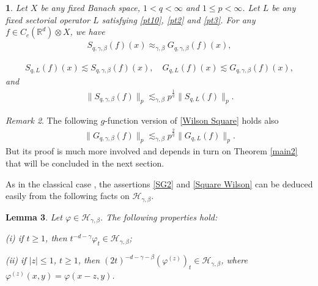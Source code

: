 \documentclass[oneside,english,a4wide]{amsart}
\numberwithin{equation}{section}
\numberwithin{figure}{section}
\theoremstyle{plain}
\newtheorem{thm}{\protect\theoremname}[section]
\theoremstyle{plain}
\theoremstyle{definition}
\theoremstyle{plain}
\newtheorem{lemma}[thm]{Lemma}
\theoremstyle{remark}
\theoremstyle{definition}
\theoremstyle{remark}
\newtheorem{remark}[thm]{Remark}
\theoremstyle{definition}
\providecommand{\theoremname}{Theorem}
\newcommand{\f}{\varphi}
\newcommand{\8}{+\infty}
\renewcommand{\1}{\mathbbm{1}}
\newcommand\sk[1]{ \left( #1 \right) }
\begin{document}
{%


\begin{thm}\label{equiv}
Let $X$ be any fixed Banach space, $1<q<\infty$ and $1\leq p<\infty$. Let $L$ be any fixed sectorial operator $L$ satisfying \eqref{pt10}, \eqref{pt2} and \eqref{pt3}. For any $f\in C_c(\mathbb R^d)\otimes X$, we have 
 \begin{align}\label{SG2}
  S_{q, \gamma,\beta}(f)(x) \approx_{\gamma, \beta} G_{q, \gamma,\beta}(f)(x),
 \end{align}
 

\begin{align}\label{Square Wilson}
    S_{q, L}(f)(x) \lesssim  S_{q, \gamma,\beta}(f)(x), \quad G_{q, L}(f)(x) \lesssim  G_{q, \gamma,\beta}(f)(x),
\end{align}
 and 
   \begin{align}\label{Wilson Square}
\| S_{q, \gamma,\beta}(f) \|_p \lesssim_{\gamma,\beta} p^{\frac{1}{q}}\| S_{q,L}(f) \|_{p}.
  \end{align}
\end{thm}

\begin{remark}
The following $g$-function version of \eqref{Wilson Square} holds also
   \begin{align}\label{Wilson G}
\| G_{q, \gamma,\beta}(f) \|_p \lesssim_{\gamma,\beta} {p^{\frac{2}{q}}  }\| G_{q,L}(f) \|_{p}.
  \end{align}
But its proof is much more involved and depends in turn on Theorem \ref{main2} that will be concluded in the next section. %
\end{remark}

As in the classical case \cite{Wilson2007}, the assertions \eqref{SG2} and \eqref{Square Wilson} can be deduced easily from the following facts on $ \mathcal{H}_{\gamma,\beta}$. %

\begin{lemma}\label{lem:facts}
Let $\f \in \mathcal{H}_{\gamma, \beta}$. The following properties hold:

{\rm (i)} if $t \geq 1$, then $t^{-d-\gamma}\f_t \in \mathcal{H}_{\gamma, \beta}$;

{\rm(ii)} if $|z| \leq 1$, $t \geq 1$, then $ (2t)^{-d-\gamma-\beta} \sk{ \f^{(z)} }_{t} \in \mathcal{H}_{\gamma, \beta} $, where $ \f^{(z)}(x,y) = \f(x-z,y) $.
\end{lemma}

}
\end{document}
